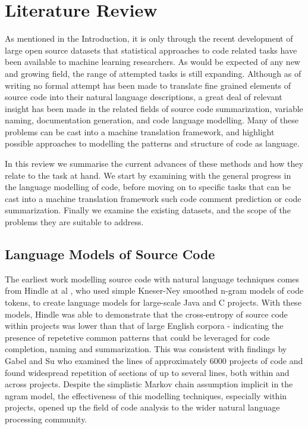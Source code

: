 \chapter{Literature Review}
\label{literature_review}


As mentioned in the Introduction, it is only through the recent development of large open source datasets that statistical approaches to code related tasks have been available to machine learning researchers. 
As would be expected of any new and growing field, the range of attempted tasks is still expanding. 
Although as of writing no formal attempt has been made to translate fine grained elements of source code into their natural language descriptions, a great deal of relevant insight has been made in the related fields of source code summarization, variable naming, documentation generation, and code language modelling. Many of these problems can be cast into a machine translation framework, and  highlight possible  approaches to modelling the patterns and structure of code as language.

In this review we summarise the current advances of these methods and how they relate to the task at hand.  We start by examining with the general progress in the language modelling of code, before moving on to specific tasks that can be cast into a machine translation framework such code comment prediction or code summarization. Finally we examine the existing datasets, and the scope of the problems they are suitable to address. 

\section{Language Models of Source Code}

The earliest work modelling source code with natural language techniques comes from Hindle at al \cite{hindle_naturalness_nodate}, who used simple Kneser-Ney smoothed n-gram models of code tokens, to create language models for large-scale Java and C projects.
With these models, Hindle was able to demonstrate that the cross-entropy of source code within projects was lower than that of large English corpora - indicating the presence of repetetive common patterns that could be leveraged for code completion, naming and summarization.
This was consistent with findings by Gabel and Su \cite{gabel_study_2010} who examined the lines of approximately 6000 projects of code and found widespread repetition of sections of up to several lines, both within and across projects.
Despite the simplistic Markov chain assumption implicit in the ngram model, the effectiveness of this modelling techniques, especially within projects, opened up the field of code analysis to the wider natural language processing community.

